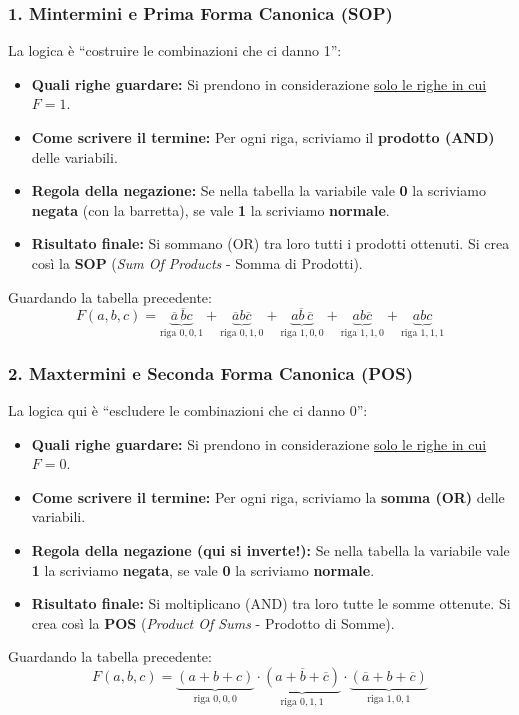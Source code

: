 \subsubsection*{1. Mintermini e Prima Forma Canonica (SOP)}
La logica è ``costruire le combinazioni che ci danno 1'':
\begin{itemize}
    \item \textbf{Quali righe guardare:} Si prendono in considerazione \underline{solo le righe in cui $F = 1$}.
    \item \textbf{Come scrivere il termine:} Per ogni riga, scriviamo il \textbf{prodotto (AND)} delle variabili.
    \item \textbf{Regola della negazione:} Se nella tabella la variabile vale \textbf{0} la scriviamo \textbf{negata} (con la barretta), se vale \textbf{1} la scriviamo \textbf{normale}.
    \item \textbf{Risultato finale:} Si sommano (OR) tra loro tutti i prodotti ottenuti. Si crea così la \textbf{SOP} (\emph{Sum Of Products} - Somma di Prodotti).
\end{itemize}
Guardando la tabella precedente:
\[
F(a,b,c) = \underbrace{\overline{a}\,\overline{b}c}_{\text{riga } 0,0,1} + \underbrace{\overline{a}b\overline{c}}_{\text{riga } 0,1,0} + \underbrace{a\overline{b}\,\overline{c}}_{\text{riga } 1,0,0} + \underbrace{ab\overline{c}}_{\text{riga } 1,1,0} + \underbrace{abc}_{\text{riga } 1,1,1}
\]

\subsubsection*{2. Maxtermini e Seconda Forma Canonica (POS)}
La logica qui è ``escludere le combinazioni che ci danno 0'':
\begin{itemize}
    \item \textbf{Quali righe guardare:} Si prendono in considerazione \underline{solo le righe in cui $F = 0$}.
    \item \textbf{Come scrivere il termine:} Per ogni riga, scriviamo la \textbf{somma (OR)} delle variabili.
    \item \textbf{Regola della negazione (qui si inverte!):} Se nella tabella la variabile vale \textbf{1} la scriviamo \textbf{negata}, se vale \textbf{0} la scriviamo \textbf{normale}.
    \item \textbf{Risultato finale:} Si moltiplicano (AND) tra loro tutte le somme ottenute. Si crea così la \textbf{POS} (\emph{Product Of Sums} - Prodotto di Somme).
\end{itemize}
Guardando la tabella precedente:
\[
F(a,b,c) = \underbrace{(a+b+c)}_{\text{riga } 0,0,0} \cdot \underbrace{(a+\overline{b}+\overline{c})}_{\text{riga } 0,1,1} \cdot \underbrace{(\overline{a}+b+\overline{c})}_{\text{riga } 1,0,1}
\]

